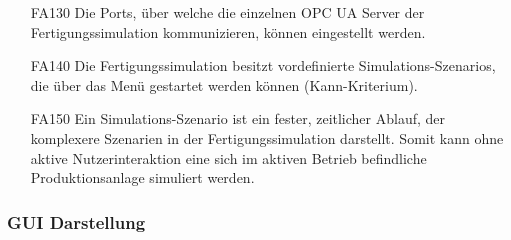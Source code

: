 \documentclass[parskip=full]{scrartcl}
\begin{document}
\begin{enumerate}
  \item[FA130] Die Ports, über welche die einzelnen \gls{OPC UA Server} der \gls{Fertigungssimulation} kommunizieren, können eingestellt werden.
  \item[FA140] Die \gls{Fertigungssimulation} besitzt vordefinierte \glspl{Simulations-Szenario}, die über das Menü gestartet werden können (Kann-Kriterium).
  \item[FA150] Ein \gls{Simulations-Szenario} ist ein fester, zeitlicher Ablauf, der komplexere Szenarien in der \gls{Fertigungssimulation} darstellt. Somit kann ohne aktive Nutzerinteraktion eine sich
    im aktiven Betrieb befindliche \gls{Produktionsanlage} simuliert werden.
\end{enumerate}

\subsubsection{GUI Darstellung}
\end{document}
